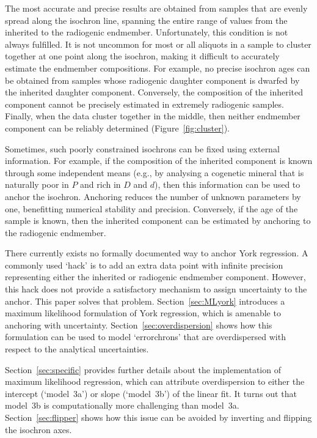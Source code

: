 \documentclass{article}
\begin{document}
  The most accurate and precise results are obtained from samples that
  are evenly spread along the isochron line, spanning the entire range
  of values from the inherited to the radiogenic
  endmember. Unfortunately, this condition is not always fulfilled. It
  is not uncommon for most or all aliquots in a sample to cluster
  together at one point along the isochron, making it difficult to
  accurately estimate the endmember compositions. For example, no
  precise isochron ages can be obtained from samples whose radiogenic
  daughter component is dwarfed by the inherited daughter
  component. Conversely, the composition of the inherited component
  cannot be precisely estimated in extremely radiogenic samples.
  Finally, when the data cluster together in the middle, then neither
  endmember component can be reliably determined
  (Figure~\ref{fig:cluster}).\medskip
  
  Sometimes, such poorly constrained isochrons can be fixed using
  external information. For example, if the composition of the
  inherited component is known through some independent means (e.g.,
  by analysing a cogenetic mineral that is naturally poor in $P$ and
  rich in $D$ and $d$), then this information can be used to anchor
  the isochron. Anchoring reduces the number of unknown parameters by
  one, benefitting numerical stability and precision. Conversely, if
  the age of the sample is known, then the inherited component can be
  estimated by anchoring to the radiogenic endmember.\medskip

  There currently exists no formally documented way to anchor York
  regression.  A commonly used `hack' is to add an extra data point
  with infinite precision representing either the inherited or
  radiogenic endmember component. However, this hack does not provide
  a satisfactory mechanism to assign uncertainty to the anchor. This
  paper solves that problem. Section~\ref{sec:MLyork} introduces a
  maximum likelihood formulation of York regression, which is amenable
  to anchoring with uncertainty. Section~\ref{sec:overdispersion}
  shows how this formulation can be used to model `errorchrons' that
  are overdispersed with respect to the analytical
  uncertainties.\medskip

  Section~\ref{sec:specific} provides further details about the
  implementation of maximum likelihood regression, which can attribute
  overdispersion to either the intercept (`model~3a') or slope
  (`model~3b') of the linear fit. It turns out that model~3b is
  computationally more challenging than
  model~3a. Section~\ref{sec:flipper} shows how this issue can be
  avoided by inverting and flipping the isochron axes.\medskip
\end{document}
